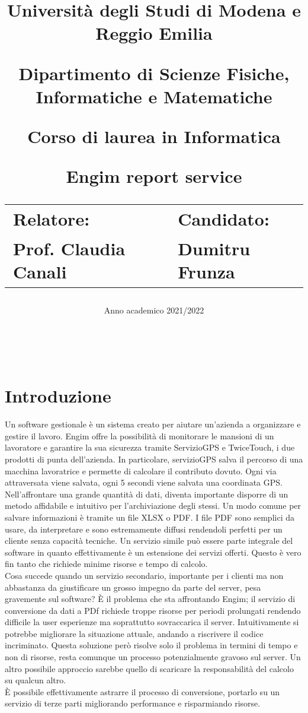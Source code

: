 \documentclass[12pt]{article}
\author{}
\title{
    \huge 
        \textbf{Università degli Studi di Modena e Reggio Emilia}
    \large
        \par Dipartimento di Scienze Fisiche, Informatiche e Matematiche
        \par Corso di laurea in Informatica
    \vfil
        \huge \par \textbf{Engim report service}
    \vfil
    \normalsize
    \begin{tabular}{lp{0.4\textwidth}l}
      Relatore: & & Candidato: \\
      Prof. Claudia Canali & &  Dumitru Frunza \\
      \end{tabular}
}
\date{Anno academico 2021/2022}
\begin{document}
\maketitle
\thispagestyle{empty}
\newpage 
\thispagestyle{empty}
\
\newpage
{}
\addtocounter{page}{0}
\listoffigures
\newpage
{}
\tableofcontents
{}
\newpage
{}
\addtocounter{page}{0}


\section*{Introduzione}
Un software gestionale è un sistema creato per aiutare un'azienda a organizzare 
e gestire il lavoro.
Engim offre la possibilità di monitorare le mansioni di un lavoratore e garantire 
la sua sicurezza tramite  ServizioGPS e TwiceTouch, i due prodotti di punta dell'azienda. 
In particolare, servizioGPS salva il percorso di una macchina lavoratrice e 
permette di calcolare il contributo dovuto. Ogni via attraversata viene salvata, 
ogni 5 secondi viene salvata una coordinata GPS.
\\ Nell'affrontare una grande quantità di dati, diventa importante
 disporre di un metodo affidabile e intuitivo per l'archiviazione degli stessi.
Un modo comune per salvare informazioni è tramite un file XLSX o PDF.
I file PDF sono semplici da usare, da interpretare e sono estremamente diffusi 
rendendoli perfetti per un cliente senza capacità tecniche. 
Un servizio simile può essere parte integrale del software in quanto effettivamente 
è un estensione dei servizi offerti. 
Questo è vero fin tanto che richiede minime risorse e tempo di calcolo.
\\ Cosa succede quando un servizio secondario, importante per i clienti ma non 
abbastanza da giustificare un grosso impegno da parte del server, pesa gravemente 
sul software? 
È il problema che sta affrontando Engim; il servizio di conversione da dati 
a PDf richiede troppe risorse per periodi prolungati rendendo difficile la user 
esperienze ma soprattutto sovraccarica il server.
Intuitivamente si potrebbe migliorare la situazione attuale, andando a riscrivere 
il codice incriminato.
Questa soluzione però risolve solo il problema in termini di tempo e non di 
risorse, resta comunque un processo potenzialmente gravoso sul server. 
Un altro possibile approccio sarebbe quello di scaricare la responsabilità del 
calcolo su qualcun altro.
\\ È possibile effettivamente astrarre il processo di conversione, portarlo su 
un servizio di terze parti migliorando performance e risparmiando risorse.
\end{document}
